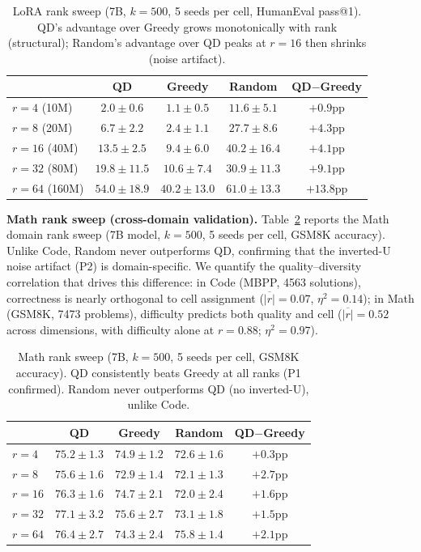 \documentclass{article}
\theoremstyle{plain}
\theoremstyle{remark}
\begin{document}
\begin{table}[h]
\centering
\caption{LoRA rank sweep (7B, $k{=}500$, 5 seeds per cell, HumanEval pass@1). QD's advantage over Greedy grows monotonically with rank (structural); Random's advantage over QD peaks at $r{=}16$ then shrinks (noise artifact).}
\label{tab:rank_sweep}
\begin{tabular}{lcccc}
\toprule
 & \textbf{QD} & \textbf{Greedy} & \textbf{Random} & \textbf{QD$-$Greedy} \\
\midrule
$r{=}4$ (10M) & $2.0 \pm 0.6$ & $1.1 \pm 0.5$ & $11.6 \pm 5.1$ & $+0.9$pp \\
$r{=}8$ (20M) & $6.7 \pm 2.2$ & $2.4 \pm 1.1$ & $27.7 \pm 8.6$ & $+4.3$pp \\
$r{=}16$ (40M) & $13.5 \pm 2.5$ & $9.4 \pm 6.0$ & $40.2 \pm 16.4$ & $+4.1$pp \\
$r{=}32$ (80M) & $19.8 \pm 11.5$ & $10.6 \pm 7.4$ & $30.9 \pm 11.3$ & $+9.1$pp \\
$r{=}64$ (160M) & $54.0 \pm 18.9$ & $40.2 \pm 13.0$ & $61.0 \pm 13.3$ & $+13.8$pp \\
\bottomrule
\end{tabular}
\end{table}

\textbf{Math rank sweep (cross-domain validation).}
Table~\ref{tab:math_rank_sweep} reports the Math domain rank sweep (7B model, $k{=}500$, 5 seeds per cell, GSM8K accuracy). Unlike Code, Random never outperforms QD, confirming that the inverted-U noise artifact (P2) is domain-specific.
We quantify the quality--diversity correlation that drives this difference: in Code (MBPP, 4563 solutions), correctness is nearly orthogonal to cell assignment ($\overline{|r|}{=}0.07$, $\eta^2{=}0.14$); in Math (GSM8K, 7473 problems), difficulty predicts both quality and cell ($\overline{|r|}{=}0.52$ across dimensions, with difficulty alone at $r{=}0.88$; $\eta^2{=}0.97$).

\begin{table}[h]
\centering
\caption{Math rank sweep (7B, $k{=}500$, 5 seeds per cell, GSM8K accuracy). QD consistently beats Greedy at all ranks (P1 confirmed). Random never outperforms QD (no inverted-U), unlike Code.}
\label{tab:math_rank_sweep}
\begin{tabular}{lcccc}
\toprule
 & \textbf{QD} & \textbf{Greedy} & \textbf{Random} & \textbf{QD$-$Greedy} \\
\midrule
$r{=}4$ & $75.2 \pm 1.3$ & $74.9 \pm 1.2$ & $72.6 \pm 1.6$ & $+0.3$pp \\
$r{=}8$ & $75.6 \pm 1.6$ & $72.9 \pm 1.4$ & $72.1 \pm 1.3$ & $+2.7$pp \\
$r{=}16$ & $76.3 \pm 1.6$ & $74.7 \pm 2.1$ & $72.0 \pm 2.4$ & $+1.6$pp \\
$r{=}32$ & $77.1 \pm 3.2$ & $75.6 \pm 2.7$ & $73.1 \pm 1.8$ & $+1.5$pp \\
$r{=}64$ & $76.4 \pm 2.7$ & $74.3 \pm 2.4$ & $75.8 \pm 1.4$ & $+2.1$pp \\
\bottomrule
\end{tabular}
\end{table}
\end{document}
